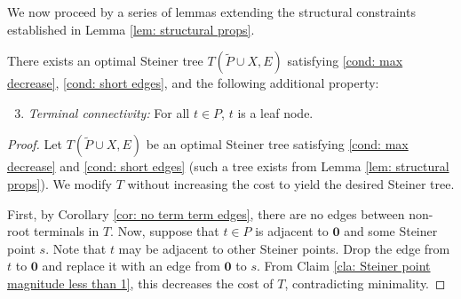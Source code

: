 \documentclass{article}\providecommand{\DeclareRedundantLanguages}[2]{}\usepackage[a4paper,margin=20mm]{geometry}
\newcommand{\1}{\textbf{1}}
\renewcommand{\tilde}{\widetilde}
\begin{document}
We now proceed by a series of lemmas extending the structural constraints established in Lemma \ref{lem: structural props}.
\begin{lemma} \label{lem: term leaf node}
There exists an optimal Steiner tree $T(\tilde{P} \cup X, E)$ satisfying \ref{cond: max decrease}, \ref{cond: short edges}, and the following additional property:
\begin{enumerate}[label=(P\arabic*)]
\setcounter{enumi}{2}
\item \textit{Terminal connectivity:} For all $t \in P$, $t$ is a leaf node. \label{cond: term leaf node}
\end{enumerate}
\end{lemma}
\begin{proof}
Let $T(\tilde{P} \cup X, E)$ be an optimal Steiner tree satisfying \ref{cond: max decrease} and \ref{cond: short edges} (such a tree exists from Lemma \ref{lem: structural props}).  We modify $T$ without increasing the cost to yield the desired Steiner tree. 

First, by Corollary \ref{cor: no term term edges}, there are no edges between non-root terminals in $T$. Now, suppose that $t \in P$ is adjacent to $\mathbf{0}$ and some Steiner point $s$. Note that $t$ may be adjacent to other Steiner points. Drop the edge from $t$ to $\mathbf{0}$ and replace it with an edge from $\mathbf{0}$ to $s$. From Claim \ref{cla: Steiner point magnitude less than 1}, this decreases the cost of $T$, contradicting minimality. 


\end{proof}
\end{document}
